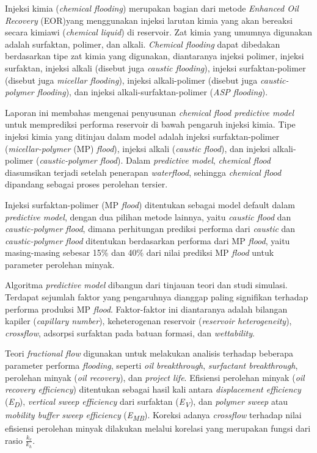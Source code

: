 \documentclass[
]{book}
\begin{document}
Injeksi kimia (\emph{chemical flooding}) merupakan bagian dari metode \emph{Enhanced Oil Recovery} (EOR)yang menggunakan injeksi larutan kimia yang akan bereaksi secara kimiawi (\emph{chemical liquid}) di reservoir. Zat kimia yang umumnya digunakan adalah surfaktan, polimer, dan alkali. \emph{Chemical flooding} dapat dibedakan berdasarkan tipe zat kimia yang digunakan, diantaranya injeksi polimer, injeksi surfaktan, injeksi alkali (disebut juga \emph{caustic flooding}), injeksi surfaktan-polimer (disebut juga \emph{micellar flooding}), injeksi alkali-polimer (disebut juga \emph{caustic-polymer flooding}), dan injeksi alkali-surfaktan-polimer (\emph{ASP flooding}).

Laporan ini membahas mengenai penyusunan \emph{chemical flood predictive model} untuk memprediksi performa reservoir di bawah pengaruh injeksi kimia. Tipe injeksi kimia yang ditinjau dalam model adalah injeksi surfaktan-polimer (\emph{micellar-polymer} (MP) \emph{flood}), injeksi alkali (\emph{caustic flood}), dan injeksi alkali-polimer (\emph{caustic-polymer flood}). Dalam \emph{predictive model}, \emph{chemical flood} diasumsikan terjadi setelah penerapan \emph{waterflood}, sehingga \emph{chemical flood} dipandang sebagai proses perolehan tersier.

Injeksi surfaktan-polimer (MP \emph{flood}) ditentukan sebagai model default dalam \emph{predictive model}, dengan dua pilihan metode lainnya, yaitu \emph{caustic flood }dan \emph{caustic-polymer flood}, dimana perhitungan prediksi performa dari \emph{caustic} dan \emph{caustic-polymer flood} ditentukan berdasarkan performa dari MP \emph{flood}, yaitu masing-masing sebesar 15\% dan 40\% dari nilai prediksi MP \emph{flood} untuk parameter perolehan minyak.

Algoritma \emph{predictive model} dibangun dari tinjauan teori dan studi simulasi. Terdapat sejumlah faktor yang pengaruhnya dianggap paling signifikan terhadap performa produksi MP \emph{flood}. Faktor-faktor ini diantaranya adalah bilangan kapiler (\emph{capillary number}), keheterogenan reservoir (\emph{reservoir heterogeneity}), \emph{crossflow}, adsorpsi surfaktan pada batuan formasi, dan \emph{wettability}.

Teori \emph{fractional flow} digunakan untuk melakukan analisis terhadap beberapa parameter performa \emph{flooding}, seperti \emph{oil breakthrough}, \emph{surfactant breakthrough}, perolehan minyak (\emph{oil recovery}), dan \emph{project life}. Efisiensi perolehan minyak (\emph{oil recovery efficiency}) ditentukan sebagai hasil kali antara \emph{displacement efficiency} (\emph{E\textsubscript{D}}), \emph{vertical sweep efficiency} dari surfaktan (\emph{E\textsubscript{V}}), dan \emph{polymer sweep} atau \emph{mobility buffer} \emph{sweep efficiency} (\emph{E\textsubscript{MB}}). Koreksi adanya \emph{crossflow} terhadap nilai efisiensi perolehan minyak dilakukan melalui korelasi yang merupakan fungsi dari rasio \(\frac{k_v}{k_h}\).
\end{document}
